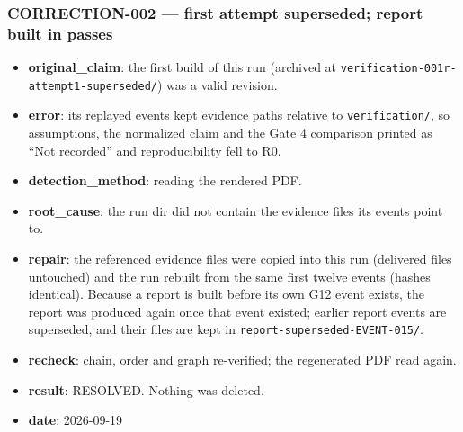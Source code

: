 \documentclass[11pt]{article}
\begin{document}
\subsubsection*{CORRECTION-002 --- first attempt superseded; report built in passes}
\begin{itemize}
\item \textbf{original\_claim}: the first build of this run (archived at \texttt{verification-001r-attempt1-superseded/}) was a valid revision.
\item \textbf{error}: its replayed events kept evidence paths relative to \texttt{verification/}, so assumptions, the normalized claim and the Gate 4 comparison printed as ``Not recorded'' and reproducibility fell to R0.
\item \textbf{detection\_method}: reading the rendered PDF.
\item \textbf{root\_cause}: the run dir did not contain the evidence files its events point to.
\item \textbf{repair}: the referenced evidence files were copied into this run (delivered files untouched) and the run rebuilt from the same first twelve events (hashes identical). Because a report is built before its own G12 event exists, the report was produced again once that event existed; earlier report events are superseded, and their files are kept in \texttt{report-superseded-EVENT-015/}.
\item \textbf{recheck}: chain, order and graph re-verified; the regenerated PDF read again.
\item \textbf{result}: RESOLVED. Nothing was deleted.
\item \textbf{date}: 2026-09-19
\end{itemize}
\end{document}
